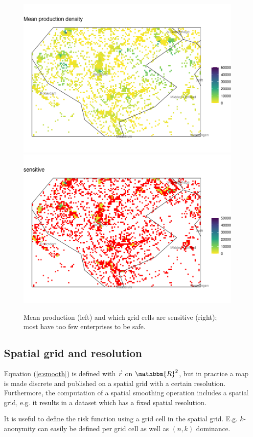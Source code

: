 \begin{figure}[H]
    \centering
    \includegraphics[width=.8\linewidth]{figures/Smoothing/mean_production_density.png} \\
    \includegraphics[width=.8\linewidth]{figures/Smoothing/sensitive.png}
    \caption{Mean production (left) and which grid cells are sensitive (right); most have too few enterprises to be safe.}
    \label{fig:sm_sensitive}
\end{figure}

\subsection{Spatial grid and resolution}

Equation (\ref{e:smooth}) is defined with $\vec{r}$ on $\mathbbm{R}^2$, 
but in practice a map is made discrete and published on a spatial grid
with a certain resolution. Furthermore, the computation of a spatial smoothing operation includes a spatial grid, e.g. it results in a dataset which has a fixed spatial resolution.

It is useful to define the risk function using a grid cell in the spatial grid. E.g. $k$-anonymity can easily be defined per grid cell as well as
$(n,k)$ dominance. 


